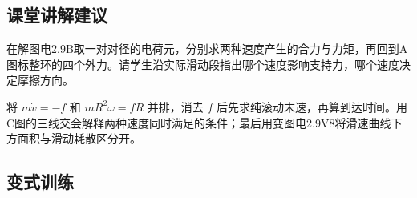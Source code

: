 \documentclass[UTF8,fontset=fandol,a4paper,11pt]{ctexart}
\begin{document}


\subsection*{课堂讲解建议}

在解图电2.9B取一对对径的电荷元，分别求两种速度产生的合力与力矩，再回到A图标整环的四个外力。请学生沿实际滑动段指出哪个速度影响支持力，哪个速度决定摩擦方向。

将 $m\dot v=-f$ 和 $mR^2\dot\omega=fR$ 并排，消去 $f$ 后先求纯滚动末速，再算到达时间。用C图的三线交会解释两种速度同时满足的条件；最后用变图电2.9V8将滑速曲线下方面积与滑动耗散区分开。


\subsection*{变式训练}
\end{document}
